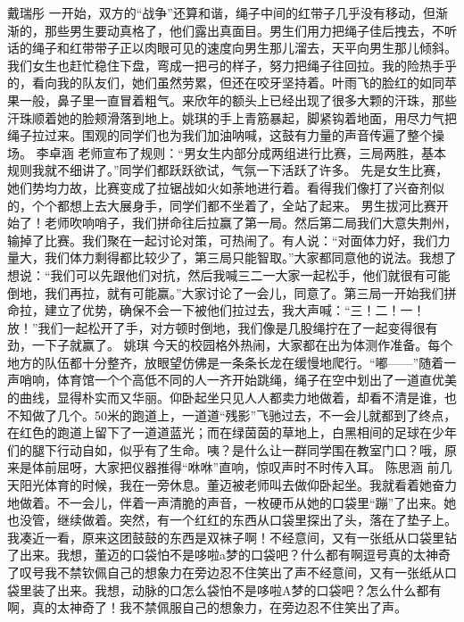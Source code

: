 {}戴瑞彤\markdownRendererInterblockSeparator
{}一开始，双方的“战争”还算和谐，绳子中间的红带子几乎没有移动，但渐渐的，那些男生要动真格了，他们露出真面目。男生们用力把绳子佳后拽去，不听话的绳子和红带带子正以肉眼可见的速度向男生那儿溜去，天平向男生那儿倾斜。\markdownRendererInterblockSeparator
{}我们女生也赶忙稳住下盘，弯成一把弓的样子，努力把绳子往回拉。我的险热手乎的，看向我的队友们，她们虽然劳累，但还在咬牙坚持着。叶雨飞的脸红的如同苹果一般，鼻子里一直冒着粗气。来欣年的额头上已经出现了很多大颗的汗珠，那些汗珠顺着她的脸颊滑落到地上。姚琪的手上青筋暴起，脚紧钩着地面，用尽力气把绳子拉过来。围观的同学们也为我们加油呐喊，这鼓有力量的声音传遍了整个操场。\markdownRendererInterblockSeparator
{}\markdownRendererInterblockSeparator
{}李卓涵\markdownRendererInterblockSeparator
{}老师宣布了规则：“男女生内部分成两组进行比赛，三局两胜，基本规则我就不细讲了。”同学们都跃跃欲试，气氛一下活跃了许多。\markdownRendererInterblockSeparator
{}先是女生比赛，她们势均力故，比赛变成了拉锯战如火如荼地进行着。看得我们像打了兴奋剂似的，个个都想上去大展身手，同学们都不坐着了，全站了起来。\markdownRendererInterblockSeparator
{}男生拔河比赛开始了！老师吹响哨子，我们拼命往后拉赢了第一局。然后第二局我们大意失荆州，输掉了比赛。我们聚在一起讨论对策，可热闹了。有人说：“对面体力好，我们力量大，我们体力剩得都比较少了，第三局只能智取。”大家都同意他的说法。我想了想说：“我们可以先跟他们对抗，然后我喊三二一大家一起松手，他们就很有可能倒地，我们再拉，就有可能赢。”大家讨论了一会儿，同意了。第三局一开始我们拼命拉，建立了优势，确保不会一下被他们拉过去，我大声喊：“三！二！一！放！”我们一起松开了手，对方顿时倒地，我们像是几股绳拧在了一起变得很有劲，一下子就赢了。\markdownRendererInterblockSeparator
{}\markdownRendererInterblockSeparator
{}姚琪\markdownRendererInterblockSeparator
{}今天的校园格外热闹，大家都在出为体测作准备。每个地方的队伍都十分整齐，放眼望仿佛是一条条长龙在缓慢地爬行。“嘟——”随着一声哨响，体育馆一个个高低不同的人一齐开始跳绳，绳子在空中划出了一道直优美的曲线，显得朴实而又华丽。仰卧起坐只见人人都卖力地做着，却看不清是谁，也不知做了几个。50米的跑道上，一道道“残影”飞驰过去，不一会儿就都到了终点，在红色的跑道上留下了一道道蓝光；而在绿茵茵的草地上，白黑相间的足球在少年们的腿下行动自如，似乎有了生命。咦？是什么让一群同学围在教室门口？哦，原来是体前屈呀，大家把仪器推得“咻咻”直响，惊叹声时不时传入耳。\markdownRendererInterblockSeparator
{}\markdownRendererInterblockSeparator
{}陈思涵\markdownRendererInterblockSeparator
{}前几天阳光体育的时候，我在一旁休息。董迈被老师叫去做仰卧起坐。我就看着她奋力地做着。不一会儿，伴着一声清脆的声音，一枚硬币从她的口袋里“蹦”了出来。她也没管，继续做着。突然，有一个红红的东西从口袋里探出了头，落在了垫子上。我凑近一看，原来这团鼓鼓的东西是双袜子啊！不经意间，又有一张纸从口袋里钻了出来。我想，董迈的口袋怕不是哆啦a梦的口袋吧？什么都有啊逗号真的太神奇了叹号我不禁钦佩自己的想象力在旁边忍不住笑出了声不经意间，又有一张纸从口袋里装了出来。我想，动脉的口怎么袋怕不是哆啦A梦的口袋吧？怎么什么都有啊，真的太神奇了！我不禁佩服自己的想象力，在旁边忍不住笑出了声。\markdownRendererDocumentEnd